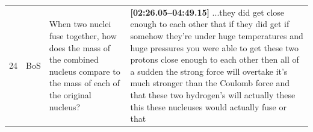 \documentclass[10pt]{article}
\begin{document}
\begin{tiny}
\begin{longtable}{|r|p{0.375in}|p{1.275in}|p{3.5in}|}
24 &          BoS &                                                                                                                                                    When two nuclei fuse together, how does the mass of the combined nucleus compare to the mass of each of the original nucleus? &                                                                                                                                                                                                                                                                                                                                                                                                                                                                                                                                                                                                                                                                                                                                                                                                                                                                                                                                                                                                                                                                                                                                                                                                                                                                                                                                                                                                                                                                                                                                                                                                                                                                                                                                                                                                                                                                                                                                                                                                                                                                                                                                                                                                                                                                                                                                                                                                                                                                                                                                                                                                                                                              \textbf{[02:26.05--04:49.15]} ...they did get close enough to each other that if they did get if somehow they're under huge temperatures and huge pressures you were able to get these two protons close enough to each other then all of a sudden the strong force will overtake it's much stronger than the Coulomb force and that these two hydrogen's will actually these this these nucleuses would actually fuse or that 
\end{longtable}
\end{tiny}
\end{document}
